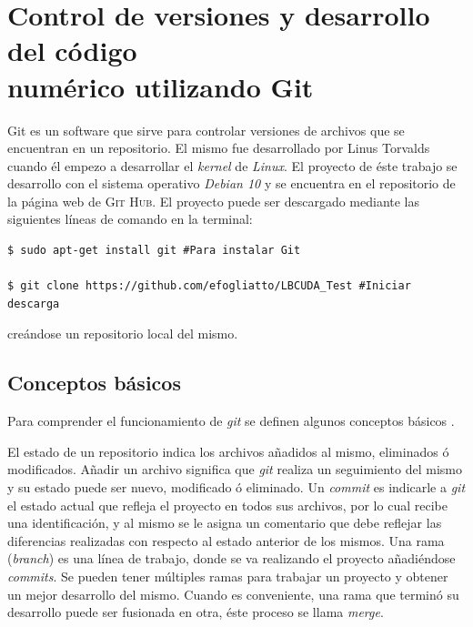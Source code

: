 \newpage
\section{Control de versiones y desarrollo del código \\ numérico utilizando Git}
\label{sec:git}

Git es un software que sirve para controlar versiones de archivos que se encuentran en un repositorio. El mismo fue desarrollado por Linus Torvalds cuando él empezo a desarrollar el \textit{kernel} de \textit{Linux}. El proyecto de éste trabajo se desarrollo con el sistema operativo \textit{Debian 10} y se encuentra en el repositorio de la página web de \textsc{Git Hub}. El proyecto puede ser descargado mediante las siguientes líneas de comando en la terminal:

{\footnotesize
	\begin{frame}{}
		\begin{lstlisting}
$ sudo apt-get install git #Para instalar Git

$ git clone https://github.com/efogliatto/LBCUDA_Test #Iniciar descarga 
		\end{lstlisting}
		
	\end{frame}
}

creándose un repositorio local del mismo.

\subsection{Conceptos básicos}

Para comprender el funcionamiento de \textit{git} se definen algunos conceptos básicos \cite{user:2020:git}. 

El estado de un repositorio indica los archivos añadidos al mismo, eliminados ó modificados. Añadir un archivo significa que \textit{git} realiza un seguimiento del mismo y su estado puede ser nuevo, modificado ó eliminado. Un \textit{commit} es indicarle a \textit{git} el estado actual que refleja el proyecto en todos sus archivos, por lo cual recibe una identificación, y al mismo se le asigna un comentario que debe reflejar las diferencias realizadas con respecto al estado anterior de los mismos. Una rama (\textit{branch}) es una línea de trabajo, donde se va realizando el proyecto añadiéndose \textit{commits}. Se pueden tener múltiples ramas para trabajar un proyecto y obtener un mejor desarrollo del mismo. Cuando es conveniente, una rama que terminó su desarrollo puede ser fusionada en otra, éste proceso se llama \textit{merge}.


